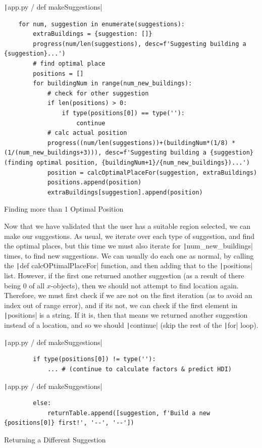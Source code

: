 \documentclass[12pt]{report}
\newcommand{\pil}[1]{\protect\texttt|#1|}
\begin{document}
\begin{listing}[H]
\pil{app.py / def makeSuggestions}
\begin{verbatim}
    for num, suggestion in enumerate(suggestions):
        extraBuildings = {suggestion: []}
        progress(num/len(suggestions), desc=f'Suggesting building a {suggestion}...')
        # find optimal place
        positions = []
        for buildingNum in range(num_new_buildings):
            # check for other suggestion
            if len(positions) > 0:
                if type(positions[0]) == type(''):
                    continue
            # calc actual position
            progress((num/len(suggestions))+(buildingNum*(1/8) *(1/(num_new_buildings+3))), desc=f'Suggesting building a {suggestion} (finding optimal position, {buildingNum+1}/{num_new_buildings})...')
            position = calcOptimalPlaceFor(suggestion, extraBuildings)
            positions.append(position)
            extraBuildings[suggestion].append(position)
\end{verbatim}
\caption{Finding more than 1 Optimal Position}\label{cs:moreThanOneOptimalPosition}
\end{listing}

Now that we have validated that the user has a suitable region selected, we can make our suggestions. As usual, we iterate over each type of suggestion, and find the optimal places, but this time we must also iterate for \pil{num_new_buildings} times, to find new suggestions. We can usually do each one as normal, by calling the \pil{def calcOPtimalPlaceFor} function, and then adding that to the \pil{positions} list. However, if the first one returned another suggestion (as a result of there being 0 of all $x$-objects), then we should not attempt to find location again. Therefore, we must first check if we are not on the first iteration (as to avoid an index out of range error), and if its not, we can check if the first element in \pil{positions} is a string. If it is, then that means we returned another suggestion instead of a location, and so we should \pil{continue} (skip the rest of the \pil{for} loop).

\begin{listing}[H]
\pil{app.py / def makeSuggestions}
\begin{verbatim}
        if type(positions[0]) != type(''):
            ... # (continue to calculate factors & predict HDI)
\end{verbatim}
\pil{app.py / def makeSuggestions}
\begin{verbatim}
        else:
            returnTable.append([suggestion, f'Build a new {positions[0]} first!', '--', '--'])
\end{verbatim}
\caption{Returning a Different Suggestion}\label{cs:returnDifferentSuggestion}
\end{listing}
\end{document}
